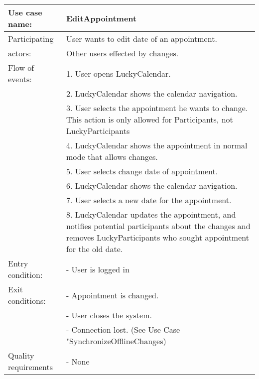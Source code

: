 {\tabulinesep=1.2mm
\begin{tabu}{ | p{3cm} | p{13cm} |}
    \hline
    Use case name: 			& 		EditAppointment\\ \hline
    Participating  			& 		User wants to edit date of an appointment. \\
    actors:					&		Other users effected by changes.\\ \hline
    Flow of events: 		& 		1. User opens LuckyCalendar. \\
							&		2. LuckyCalendar shows the calendar navigation.\\
							&		3. User selects the appointment he wants to change. This action is only allowed for Participants, not LuckyParticipants\\
							&		4. LuckyCalendar shows the appointment in normal mode that allows changes.\\
							&		5. User selects change date of appointment.\\
							&		6. LuckyCalendar shows the calendar navigation.\\
							&		7. User selects a new date for the appointment.\\
							&		8. LuckyCalendar updates the appointment, and notifies potential participants about the changes and removes LuckyParticipants who sought appointment for the old date.\\ \hline
    Entry condition: 		& 		- User is logged in  \\\hline
	Exit conditions: 		&		- Appointment is changed.\\
							&		- User closes the system.\\
							&		- Connection lost. (See Use Case "SynchronizeOfflineChanges)\\\hline
	Quality requirements	&	 	- None \\\hline
\end{tabu}
}